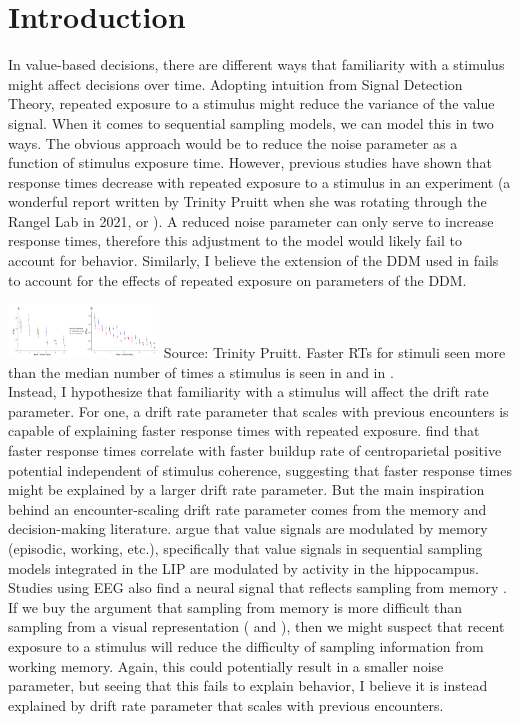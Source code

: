 \documentclass[
]{book}
\begin{document}
\hypertarget{introduction}{%
\section{Introduction}\label{introduction}}

In value-based decisions, there are different ways that familiarity with a stimulus might affect decisions over time. Adopting intuition from Signal Detection Theory, repeated exposure to a stimulus might reduce the variance of the value signal. When it comes to sequential sampling models, we can model this in two ways. The obvious approach would be to reduce the noise parameter as a function of stimulus exposure time. However, previous studies have shown that response times decrease with repeated exposure to a stimulus in an experiment (a wonderful report written by Trinity Pruitt when she was rotating through the Rangel Lab in 2021, or \citep{agranov2017}). A reduced noise parameter can only serve to increase response times, therefore this adjustment to the model would likely fail to account for behavior. Similarly, I believe the extension of the DDM used in \citep{agranov2017} fails to account for the effects of repeated exposure on parameters of the DDM.

\includegraphics[width=0.3\textwidth,height=\textheight]{images/mem-aDDM-fasterRTs.PNG}
Source: Trinity Pruitt. Faster RTs for stimuli seen more than the median number of times a stimulus is seen in \citep{smith2018} and in \citep{eum2022}.\\

Instead, I hypothesize that familiarity with a stimulus will affect the drift rate parameter. For one, a drift rate parameter that scales with previous encounters is capable of explaining faster response times with repeated exposure. \citep{kelly2013} find that faster response times correlate with faster buildup rate of centroparietal positive potential independent of stimulus coherence, suggesting that faster response times might be explained by a larger drift rate parameter. But the main inspiration behind an encounter-scaling drift rate parameter comes from the memory and decision-making literature. \citep{shadlen2016} argue that value signals are modulated by memory (episodic, working, etc.), specifically that value signals in sequential sampling models integrated in the LIP are modulated by activity in the hippocampus. Studies using EEG also find a neural signal that reflects sampling from memory \citep{vanede2022}. If we buy the argument that sampling from memory is more difficult than sampling from a visual representation (\citep{weilbacher2021} and \citep{eum2022}), then we might suspect that recent exposure to a stimulus will reduce the difficulty of sampling information from working memory. Again, this could potentially result in a smaller noise parameter, but seeing that this fails to explain behavior, I believe it is instead explained by drift rate parameter that scales with previous encounters.
\end{document}
